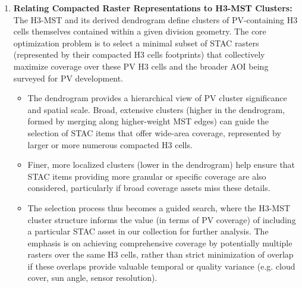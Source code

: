 \begin{enumerate}
    \item \textbf{Relating Compacted Raster Representations to H3-MST Clusters:}
        The H3-MST and its derived dendrogram define clusters of PV-containing H3 cells themselves contained within a given division geometry. 
        The core optimization problem is to select a minimal subset of STAC rasters (represented by their compacted H3 cells footprints) that collectively maximize coverage over these PV H3 cells and the broader AOI being surveyed for PV development.
        \begin{itemize}
            \item The dendrogram provides a hierarchical view of PV cluster significance and spatial scale. Broad, extensive clusters (higher in the dendrogram, formed by merging along higher-weight MST edges) 
            can guide the selection of STAC items that offer wide-area coverage, represented by larger or more numerous compacted H3 cells.
            \item Finer, more localized clusters (lower in the dendrogram) help ensure that STAC items providing more granular or specific coverage are also considered, particularly if broad coverage assets miss these details.
            \item The selection process thus becomes a guided search, where the H3-MST cluster structure informs the value (in terms of PV coverage) of including a particular STAC asset in our collection for further analysis. 
            The emphasis is on achieving comprehensive coverage by potentially multiple rasters over the same H3 cells, rather than strict minimization of overlap if these overlaps provide valuable temporal or quality variance (e.g. cloud cover, sun angle, sensor resolution). 
        \end{itemize}


\end{enumerate}
